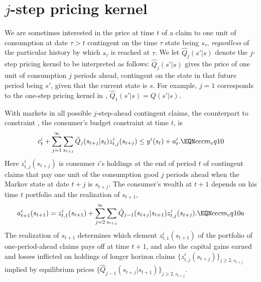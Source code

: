 \section{$j$-step pricing kernel}\label{sec:multi-step}%
We are sometimes interested in the price at time $t$ of a claim to
one unit of consumption at date $\tau >t $ contingent on the
time $\tau$ state being $s_\tau$, {\it regardless\/} of the
particular history by which $s_\tau$ is reached at $\tau$.  We let
$\hat Q_j(s' | s)$ denote the $j$-step pricing kernel to be interpreted
as follows: $\hat Q_j(s' | s)$ gives the price of one unit of
consumption $j$ periods ahead, contingent on the state in that
future period being $s'$, given that the current state is $s$. For
example, $j=1$ corresponds to the one-step pricing kernel 
in , $\hat Q_1(s' | s) = Q(s' | s)$.


With markets in all possible $j$-step-ahead contingent claims,
the counterpart to constraint , the consumer's budget
constraint at time $t$, is
$$ c_t^i + \sum_{j=1}^\infty \sum_{ s_{t+j}} 
   \hat Q_j( s_{t+j} | s_t)
   z^i_{t,j}( s_{t+j}) \leq  y^i(s_t) + a_t^i. \EQN cecm_eq10   $$
Here $z^i_{t,j}( s_{t+j})$ is consumer $i$'s holdings at
the end of period $t$ of contingent claims that pay one unit of
the consumption good $j$ periods ahead when %
the Markov state at date $t+j$ is $ s_{t+j}$. The consumer's
wealth at $t+1$   depends on his time $t$  portfolio
and the realization of $s_{t+1}$,
$$
a^i_{t+1}(s_{t+1}) = z^i_{t,1}(s_{t+1})
   + \sum_{j=2}^\infty \sum_{ s_{t+j}}  
  \hat Q_{j-1}( s_{t+j} | s_{t+1})
           z^i_{t,j}( s_{t+j}) . \EQN cecm_eq10a
$$
The realization of $s_{t+1}$ determines which element 
$z^i_{t,1}( s_{t+1})$ of the portfolio of
one-period-ahead claims pays off at
time $t+1$,
and also the capital gains earned and losses inflicted on  holdings of longer horizon claims 
$\{z^i_{t,j}( s_{t+j})\}_{j\geq 2, s_{t+j}}$
implied by equilibrium prices 
$\{\hat Q_{j-1}( s_{t+j} | s_{t+1})\}_{j\geq 2, s_{t+j}}$.


